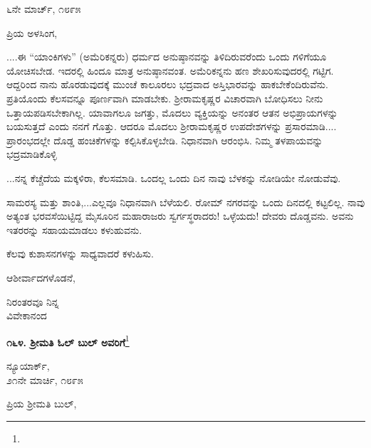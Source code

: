 \vspace{-0.5cm}

\begin{flushright}
೬ನೇ ಮಾರ್ಚ್, ೧೮೯೫
\end{flushright}

\vspace{-0.5cm}

\noindent
ಪ್ರಿಯ ಅಳಸಿಂಗ,

....ಈ “ಯಾಂಕಿಗಳು” (ಅಮೆರಿಕನ್ನರು) ಧರ್ಮದ ಅನುಷ್ಠಾನವನ್ನು ತಿಳಿದಿರುವರೆಂದು ಒಂದು ಗಳಿಗೆಯೂ ಯೋಚಿಸಬೇಡ. ಇದರಲ್ಲಿ ಹಿಂದೂ ಮಾತ್ರ ಅನುಷ್ಠಾನವಂತ. ಅಮೆರಿಕನ್ನನು ಹಣ ಶೇಖರಿಸುವುದರಲ್ಲಿ ಗಟ್ಟಿಗ. ಆದ್ದರಿಂದ ನಾನು ಹೊರಡುವುದಕ್ಕೆ ಮುಂಚೆ ಕಾಲೂರಲು ಭದ್ರವಾದ ಅಸ್ತಿಭಾರವನ್ನು ಹಾಕಬೇಕೆಂದಿರುವೆನು. ಪ್ರತಿಯೊಂದು ಕೆಲಸವನ್ನೂ ಪೂರ್ಣವಾಗಿ ಮಾಡಬೇಕು. ಶ‍್ರೀರಾಮಕೃಷ್ಣರ ವಿಚಾರವಾಗಿ ಬೋಧಿಸಲು ನೀನು ಒತ್ತಾಯಪಡಿಸಬೇಕಾಗಿಲ್ಲ. ಯಾವಾಗಲೂ ಜಗತ್ತು, ಮೊದಲು ವ್ಯಕ್ತಿಯನ್ನು ಅನಂತರ ಆತನ ಅಭಿಪ್ರಾಯಗಳನ್ನು ಬಯಸುತ್ತದೆ ಎಂದು ನನಗೆ ಗೊತ್ತು. ಆದರೂ ಮೊದಲು ಶ‍್ರೀರಾಮಕೃಷ್ಣರ ಉಪದೇಶಗಳನ್ನು ಪ್ರಸಾರಮಾಡಿ.... ಪ್ರಾರಂಭದಲ್ಲೇ ದೊಡ್ಡ ಹಂಚಿಕೆಗಳನ್ನು ಕಲ್ಪಿಸಿಕೊಳ್ಳಬೇಡಿ. ನಿಧಾನವಾಗಿ ಆರಂಭಿಸಿ. ನಿಮ್ಮ ತಳಪಾಯವನ್ನು ಭದ್ರಮಾಡಿಕೊಳ್ಳಿ

...ನನ್ನ ಕೆಚ್ಚೆದೆಯ ಮಕ್ಕಳಿರಾ, ಕೆಲಸಮಾಡಿ. ಒಂದಲ್ಲ ಒಂದು ದಿನ ನಾವು ಬೆಳಕನ್ನು ನೋಡಿಯೇ ನೋಡುವೆವು.

ಸಾಮರಸ್ಯ ಮತ್ತು ಶಾಂತಿ,...ಎಲ್ಲವೂ ನಿಧಾನವಾಗಿ ಬೆಳೆಯಲಿ. ರೋಮ್ ನಗರವನ್ನು ಒಂದು ದಿನದಲ್ಲಿ ಕಟ್ಟಲಿಲ್ಲ. ನಾವು ಅತ್ಯಂತ ಭರವಸೆಯಿಟ್ಟಿದ್ದ ಮೈಸೂರಿನ ಮಹಾರಾಜರು ಸ್ವರ್ಗಸ್ಥರಾದರು! ಒಳ್ಳೆಯದು! ದೇವರು ದೊಡ್ಡವನು. ಅವನು ಇತರರನ್ನು ಸಹಾಯಮಾಡಲು ಕಳುಹುವನು.

ಕೆಲವು ಕುಶಾಸನಗಳನ್ನು ಸಾಧ್ಯವಾದರೆ ಕಳುಹಿಸು.

ಆಶೀರ್ವಾದಗಳೊಡನೆ,

\vspace{-0.5cm}

{\flushright
ನಿರಂತರವೂ ನಿನ್ನ\\ವಿವೇಕಾನಂದ\par}

\begin{center}
\textbf{೧೬೪. ಶ‍್ರೀಮತಿ ಓಲ್ ಬುಲ್ ಅವರಿಗೆ}\footnote{}
\end{center}

\vspace{-0.5cm}

\begin{flushright}
ನ್ಯೂಯಾರ್ಕ್,\\೨೧ನೇ ಮಾರ್ಚಿ, ೧೮೯೫
\end{flushright}

\vspace{-0.5cm}

\noindent
ಪ್ರಿಯ ಶ‍್ರೀಮತಿ ಬುಲ್,

